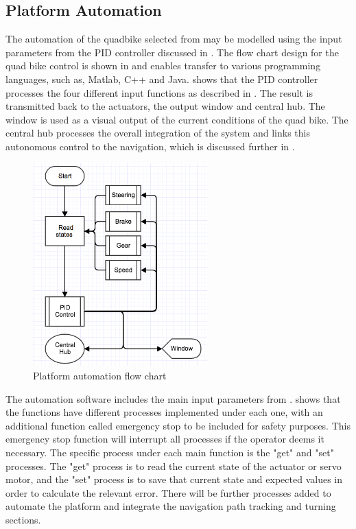 \documentclass[main.tex]{subfiles}
\begin{document}
\subsection{Platform Automation}
The automation of the quadbike selected from  may be modelled using the input parameters from the PID controller discussed in . The flow chart design for the quad bike control is shown in  and enables transfer to various programming languages, such as, Matlab, C++ and Java.  shows that the PID controller processes the four different input functions as described in . The result is transmitted back to the actuators, the output window and central hub. The window is used as a visual output of the current conditions of the quad bike. The central hub processes the overall integration of the system and links this autonomous control to the navigation, which is discussed further in . 

\begin{figure}[ht]
\includegraphics[width=0.6\textwidth]{4-ConceptDesign/autoflowchart.png}
\centering
\caption{Platform automation flow chart} 
\end{figure}

The automation software includes the main input parameters from .  shows that the functions have different processes implemented under each one, with an additional function called emergency stop to be included for safety purposes. This emergency stop function will interrupt all processes if the operator deems it necessary. The specific process under each main function is the "get" and "set" processes. The "get" process is to read the current state of the actuator or servo motor, and the "set" process is to save that current state and expected values in order to calculate the relevant error. There will be further processes added to automate the platform and integrate the navigation path tracking and turning sections.
\end{document}
